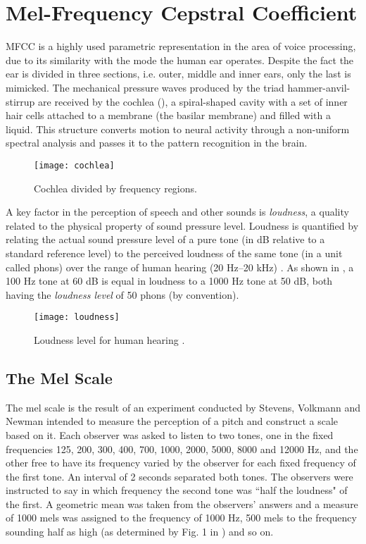 \newpage


\section{Mel-Frequency Cepstral Coefficient}

MFCC is a highly used parametric representation in the area of voice processing,
due to its similarity with the mode the human ear operates. Despite the fact the
ear is divided in three sections, i.e. outer, middle and inner ears, only the last
is mimicked. The mechanical pressure waves produced by the triad hammer-anvil-stirrup
are received by the cochlea (), a spiral-shaped cavity with a
set of inner hair cells attached to a membrane (the basilar membrane) and filled
with a liquid. This structure converts motion to neural activity through a non-uniform
spectral analysis \autocite{rabiner.schafer.2007} and passes it to the pattern
recognition in the brain.

\begin{figure}[ht]
    \centering
    \texttt{[image: cochlea]}
    \caption{Cochlea divided by frequency regions.}
    \label{fig:cochlea}
\end{figure}

A key factor in the perception of speech and other sounds is \emph{loudness}, a
quality related to the physical property of sound pressure level. Loudness is
quantified by relating the actual sound pressure level of a pure tone (in dB
relative to a standard reference level) to the perceived loudness of the same
tone (in a unit called phons) over the range of human hearing (20 Hz–20 kHz)
\autocite{rabiner.schafer.2007}. As shown in , a 100 Hz tone
at 60 dB is equal in loudness to a 1000 Hz tone at 50 dB, both having the
\emph{loudness level} of 50 phons (by convention).


\begin{figure}[ht]
    \centering
    \texttt{[image: loudness]}
    \caption{Loudness level for human hearing \autocite{fletcher.munson.1933}.}
    \label{fig:loudness}
\end{figure}


\subsection{The Mel Scale}

The mel scale is the result of an experiment conducted by Stevens, Volkmann and
Newman \autocite{stevens.volkmann.newman.1937} intended to measure the perception
of a pitch and construct a scale based on it. Each observer was asked to listen
to two tones, one in the fixed frequencies 125, 200, 300, 400, 700, 1000, 2000,
5000, 8000 and 12000 Hz, and the other free to have its frequency varied by the
observer for each fixed frequency of the first tone. An interval of 2 seconds
separated both tones. The observers were instructed to say in which frequency the
second tone was ``half the loudness" of the first. A geometric mean was taken from
the observers' answers and a measure of 1000 mels was assigned to the frequency
of 1000 Hz, 500 mels to the frequency sounding half as high (as determined by Fig. 1
in \autocite{stevens.volkmann.newman.1937}) and so on.

